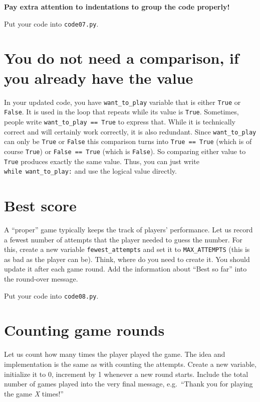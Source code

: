 \documentclass[
]{book}
\begin{document}
\textbf{Pay extra attention to indentations to group the code properly!}

Put your code into \texttt{code07.py}.

\hypertarget{you-do-not-need-a-comparison-if-you-already-have-the-value}{%
\section{You do not need a comparison, if you already have the value}\label{you-do-not-need-a-comparison-if-you-already-have-the-value}}

In your updated code, you have \texttt{want\_to\_play} variable that is either \texttt{True} or \texttt{False}. It is used in the loop that repeats while its value is \texttt{True}. Sometimes, people write \texttt{want\_to\_play\ ==\ True} to express that. While it is technically correct and will certainly work correctly, it is also redundant. Since \texttt{want\_to\_play} can only be \texttt{True} or \texttt{False} this comparison turns into \texttt{True\ ==\ True} (which is of course \texttt{True}) or \texttt{False\ ==\ True} (which is \texttt{False}). So comparing either value to \texttt{True} produces exactly the same value. Thus, you can just write \texttt{while\ want\_to\_play:} and use the logical value directly.

\hypertarget{best-score}{%
\section{Best score}\label{best-score}}

A ``proper'' game typically keeps the track of players' performance. Let us record a fewest number of attempts that the player needed to guess the number. For this, create a new variable \texttt{fewest\_attempts} and set it to \texttt{MAX\_ATTEMPTS} (this is as bad as the player can be). Think, where do you need to create it. You should update it after each game round. Add the information about ``Best so far'' into the round-over message.

Put your code into \texttt{code08.py}.

\hypertarget{counting-game-rounds}{%
\section{Counting game rounds}\label{counting-game-rounds}}

Let us count how many times the player played the game. The idea and implementation is the same as with counting the attempts. Create a new variable, initialize it to 0, increment by 1 whenever a new round starts. Include the total number of games played into the very final message, e.g.~``Thank you for playing the game \emph{X} times!''
\end{document}
